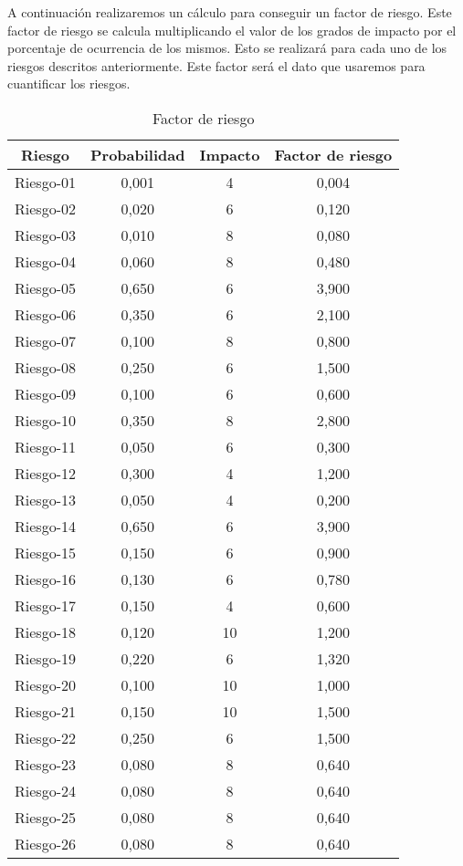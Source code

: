 \par A continuación realizaremos un cálculo para conseguir un factor de riesgo. Este factor de riesgo se calcula multiplicando el valor de los grados de impacto por el porcentaje de ocurrencia de los mismos. Esto se realizará para cada uno de los riesgos descritos anteriormente. Este factor será el dato que usaremos para cuantificar los riesgos.


\begin{table}[H]
\begin{center}
\begin{tabular}{c|ccc}
\textbf{Riesgo} & \textbf{Probabilidad} & \textbf{Impacto} & \textbf{Factor de riesgo} \\
\hline \hline
Riesgo-01	&	0,001	&	4	&	0,004	\\
Riesgo-02	&	0,020	&	6	&	0,120	\\
Riesgo-03	&	0,010	&	8	&	0,080	\\
Riesgo-04	&	0,060	&	8	&	0,480	\\
Riesgo-05	&	0,650	&	6	&	3,900	\\
Riesgo-06	&	0,350	&	6	&	2,100	\\
Riesgo-07	&	0,100	&	8	&	0,800	\\
Riesgo-08	&	0,250	&	6	&	1,500	\\
Riesgo-09	&	0,100	&	6	&	0,600	\\
Riesgo-10	&	0,350	&	8	&	2,800	\\
Riesgo-11	&	0,050	&	6	&	0,300	\\
Riesgo-12	&	0,300	&	4	&	1,200	\\
Riesgo-13	&	0,050	&	4	&	0,200	\\
Riesgo-14	&	0,650	&	6	&	3,900	\\
Riesgo-15	&	0,150	&	6	&	0,900	\\
Riesgo-16	&	0,130	&	6	&	0,780	\\
Riesgo-17	&	0,150	&	4	&	0,600	\\
Riesgo-18	&	0,120	&	10	&	1,200	\\
Riesgo-19	&	0,220	&	6	&	1,320	\\
Riesgo-20	&	0,100	&	10	&	1,000	\\
Riesgo-21	&	0,150	&	10	&	1,500	\\
Riesgo-22	&	0,250	&	6	&	1,500	\\
Riesgo-23	&	0,080	&	8	&	0,640	\\
Riesgo-24	&	0,080	&	8	&	0,640	\\
Riesgo-25	&	0,080	&	8	&	0,640	\\
Riesgo-26	&	0,080	&	8	&	0,640	\\
\end{tabular}
\caption{Factor de riesgo}
\label{tab:analisis-cualitativo}
\end{center}
\end{table}


